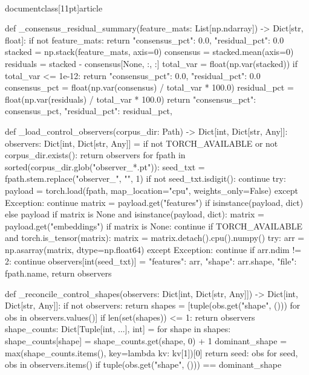 \\documentclass[11pt]{article}
\begin{document}
\begin{CodeBlock}
def _consensus_residual_summary(feature_mats: List[np.ndarray]) -> Dict[str, float]:
    if not feature_mats:
        return {"consensus_pct": 0.0, "residual_pct": 0.0}
    stacked = np.stack(feature_mats, axis=0)
    consensus = stacked.mean(axis=0)
    residuals = stacked - consensus[None, :, :]
    total_var = float(np.var(stacked))
    if total_var <= 1e-12:
        return {"consensus_pct": 0.0, "residual_pct": 0.0}
    consensus_pct = float(np.var(consensus) / total_var * 100.0)
    residual_pct = float(np.var(residuals) / total_var * 100.0)
    return {
        "consensus_pct": consensus_pct,
        "residual_pct": residual_pct,
    }


def _load_control_observers(corpus_dir: Path) -> Dict[int, Dict[str, Any]]:
    observers: Dict[int, Dict[str, Any]] = {}
    if not TORCH_AVAILABLE or not corpus_dir.exists():
        return observers
    for fpath in sorted(corpus_dir.glob("observer_*.pt")):
        seed_txt = fpath.stem.replace("observer_", "", 1)
        if not seed_txt.isdigit():
            continue
        try:
            payload = torch.load(fpath, map_location="cpu", weights_only=False)
        except Exception:
            continue
        matrix = payload.get("features") if isinstance(payload, dict) else payload
        if matrix is None and isinstance(payload, dict):
            matrix = payload.get("embeddings")
        if matrix is None:
            continue
        if TORCH_AVAILABLE and torch.is_tensor(matrix):
            matrix = matrix.detach().cpu().numpy()
        try:
            arr = np.asarray(matrix, dtype=np.float64)
        except Exception:
            continue
        if arr.ndim != 2:
            continue
        observers[int(seed_txt)] = {
            "features": arr,
            "shape": arr.shape,
            "file": fpath.name,
        }
    return observers


def _reconcile_control_shapes(observers: Dict[int, Dict[str, Any]]) -> Dict[int, Dict[str, Any]]:
    if not observers:
        return {}
    shapes = [tuple(obs.get("shape", ())) for obs in observers.values()]
    if len(set(shapes)) <= 1:
        return observers
    shape_counts: Dict[Tuple[int, ...], int] = {}
    for shape in shapes:
        shape_counts[shape] = shape_counts.get(shape, 0) + 1
    dominant_shape = max(shape_counts.items(), key=lambda kv: kv[1])[0]
    return {seed: obs for seed, obs in observers.items() if tuple(obs.get("shape", ())) == dominant_shape}



\end{CodeBlock}
\end{document}
